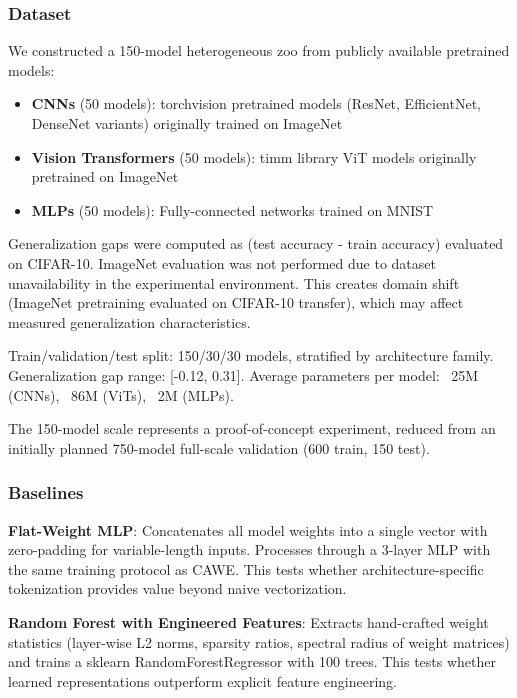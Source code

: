 
\subsubsection{Dataset}

We constructed a 150-model heterogeneous zoo from publicly available pretrained models:

\begin{itemize}
\item \textbf{CNNs} (50 models): torchvision pretrained models (ResNet, EfficientNet, DenseNet variants) originally trained on ImageNet
\item \textbf{Vision Transformers} (50 models): timm library ViT models originally pretrained on ImageNet
\item \textbf{MLPs} (50 models): Fully-connected networks trained on MNIST
\end{itemize}

Generalization gaps were computed as (test accuracy - train accuracy) evaluated on CIFAR-10. ImageNet evaluation was not performed due to dataset unavailability in the experimental environment. This creates domain shift (ImageNet pretraining evaluated on CIFAR-10 transfer), which may affect measured generalization characteristics.

Train/validation/test split: 150/30/30 models, stratified by architecture family. Generalization gap range: [-0.12, 0.31]. Average parameters per model: ~25M (CNNs), ~86M (ViTs), ~2M (MLPs).

The 150-model scale represents a proof-of-concept experiment, reduced from an initially planned 750-model full-scale validation (600 train, 150 test).

\subsubsection{Baselines}

\textbf{Flat-Weight MLP}: Concatenates all model weights into a single vector with zero-padding for variable-length inputs. Processes through a 3-layer MLP with the same training protocol as CAWE. This tests whether architecture-specific tokenization provides value beyond naive vectorization.

\textbf{Random Forest with Engineered Features}: Extracts hand-crafted weight statistics (layer-wise L2 norms, sparsity ratios, spectral radius of weight matrices) and trains a sklearn RandomForestRegressor with 100 trees. This tests whether learned representations outperform explicit feature engineering.

